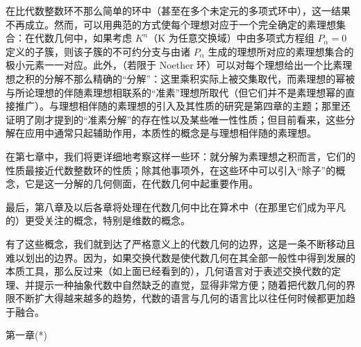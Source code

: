 在比代数整数环不那么简单的环中（甚至在多个未定元的多项式环中），这一结果不再成立。然而，可以用典范的方式使每个理想对应于一个完全确定的素理想集合：在代数几何中，如果考虑 \(K^{n}\)（K 为任意交换域）中由多项式方程组 \(P_{\alpha}=0\) 定义的子簇，则该子簇的不可约分支与由诸 \(P_{\alpha}\) 生成的理想所对应的素理想集合的极小元素一一对应。此外，（若限于 Noether 环）可以对每个理想给出一个比素理想之积的分解不那么精确的“分解”：这里乘积实际上被交集取代，而素理想的幂被与所论理想的伴随素理想相联系的“准素”理想所取代（但它们并不是素理想幂的直接推广）。与理想相伴随的素理想的引入及其性质的研究是第四章的主题；那里还证明了刚才提到的“准素分解”的存在性以及某些唯一性性质；但目前看来，这些分解在应用中通常只起辅助作用，本质性的概念是与理想相伴随的素理想。

在第七章中，我们将更详细地考察这样一些环：就分解为素理想之积而言，它们的性质最接近代数整数环的性质；除其他事项外，在这些环中可以引入“除子”的概念，它是这一分解的几何侧面，在代数几何中起重要作用。

最后，第八章及以后各章将处理在代数几何中比在算术中（在那里它们成为平凡的）更受关注的概念，特别是维数的概念。

有了这些概念，我们就到达了严格意义上的代数几何的边界，这是一条不断移动且难以划出的边界。因为，如果交换代数是使代数几何在其全部一般性中得到发展的本质工具，那么反过来（如上面已经看到的），几何语言对于表述交换代数的定理、并提示一种抽象代数中自然缺乏的直觉，显得非常方便；随着把代数几何的界限不断扩大得越来越多的趋势，代数的语言与几何的语言比以往任何时候都更加趋于融合。

第一章(*)

